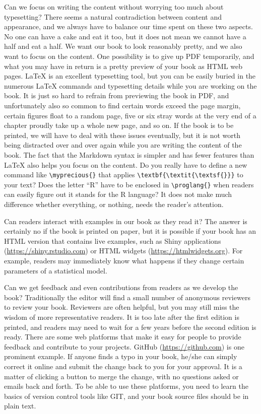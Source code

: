 \documentclass[
  10pt,
]{krantz}
\begin{document}
Can we focus on writing the content without worrying too much about typesetting? There seems a natural contradiction between content and appearance, and we always have to balance our time spent on these two aspects. No one can have a cake and eat it too, but it does not mean we cannot have a half and eat a half. We want our book to look reasonably pretty, and we also want to focus on the content. One possibility is to give up PDF temporarily, and what you may have in return is a pretty preview of your book as HTML web pages. LaTeX is an excellent typesetting tool, but you can be easily buried in the numerous LaTeX commands and typesetting details while you are working on the book. It is just so hard to refrain from previewing the book in PDF, and unfortunately also so common to find certain words exceed the page margin, certain figures float to a random page, five or six stray words at the very end of a chapter proudly take up a whole new page, and so on. If the book is to be printed, we will have to deal with these issues eventually, but it is not worth being distracted over and over again while you are writing the content of the book. The fact that the Markdown syntax is simpler and has fewer features than LaTeX also helps you focus on the content. Do you really have to define a new command like \texttt{\textbackslash{}myprecious\{\}} that applies \texttt{\textbackslash{}textbf\{\textbackslash{}textit\{\textbackslash{}textsf\{\}\}\}} to your text? Does the letter ``R'' have to be enclosed in \texttt{\textbackslash{}proglang\{\}} when readers can easily figure out it stands for the R language? It does not make much difference whether everything, or nothing, needs the reader's attention.

Can readers interact with examples in our book as they read it? The answer is certainly no if the book is printed on paper, but it is possible if your book has an HTML version that contains live examples, such as Shiny applications (\url{https://shiny.rstudio.com}) or HTML widgets (\url{https://htmlwidgets.org}). For example, readers may immediately know what happens if they change certain parameters of a statistical model.

Can we get feedback and even contributions from readers as we develop the book? Traditionally the editor will find a small number of anonymous reviewers to review your book. Reviewers are often helpful, but you may still miss the wisdom of more representative readers. It is too late after the first edition is printed, and readers may need to wait for a few years before the second edition is ready. There are some web platforms that make it easy for people to provide feedback and contribute to your projects. GitHub (\url{https://github.com}) is one prominent example. If anyone finds a typo in your book, he/she can simply correct it online and submit the change back to you for your approval. It is a matter of clicking a button to merge the change, with no questions asked or emails back and forth. To be able to use these platforms, you need to learn the basics of version control tools like GIT, and your book source files should be in plain text.
\end{document}

